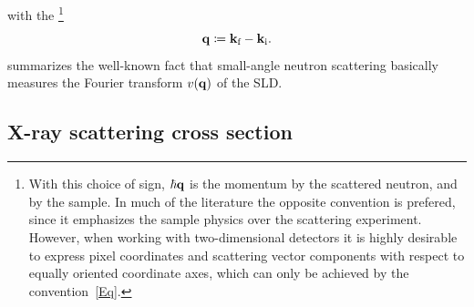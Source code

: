 %
with the \footnote
{With this choice of sign,
%
$\hbar\mathbf{q}$ is the momentum
%
 by the scattered neutron,
and  by the sample.
In much of the literature the opposite convention is prefered,
since it emphasizes the sample physics over the scattering experiment.
However, when working with two-dimensional detectors
it is highly desirable to express pixel coordinates
and scattering vector components
with respect to equally oriented coordinate axes,
which can only be achieved by the convention~\cref{Eq}.}
%
\begin{equation}%
  \q\coloneqq \k_\sf-\k_\si.
\end{equation}
%
 summarizes the well-known fact that
small-angle neutron scattering basically measures
the Fourier transform $v(\mathbf{q})$ of the SLD.
%
%

\subsection{X-ray scattering cross section}%

\def\Ei{\v{E}_\si}
\def\Eic{\Ei^*}
\def\Ef{\v{E}_\sf}
\def\Efc{\Ef^*}
\def\Eo{\TENS{\overset{o}{\v{E}}}}
\def\Efo{\Eo_\sf}
\def\Efoc{\Eo\vphantom{E}^*_\sf}
\def\he{\v{\hat e}}
\def\hef{\he_\sf}
\def\hei{\he_\si}
\def\sif{\text{i,f}}

